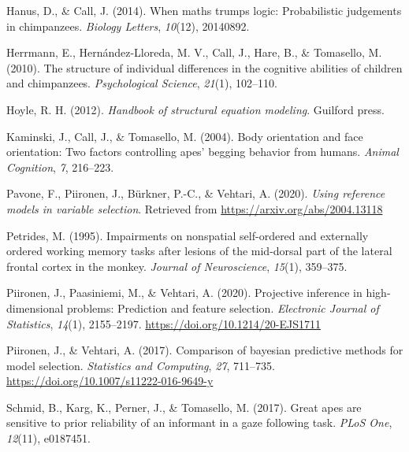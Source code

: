 \documentclass[
  man,floatsintext]{apa6}
\newlength{\cslhangindent}
\newlength{\cslentryspacingunit} %
\newenvironment{CSLReferences}[2] %
 {%
  \setlength{\parindent}{0pt}
  \ifodd #1
  \let\oldpar\par
  \def\par{\hangindent=\cslhangindent\oldpar}
  \fi
  \setlength{\parskip}{#2\cslentryspacingunit}
 }%
 {}
\begin{document}
\begin{CSLReferences}{1}{0}
\leavevmode{}%
Hanus, D., \& Call, J. (2014). When maths trumps logic: Probabilistic judgements in chimpanzees. \emph{Biology Letters}, \emph{10}(12), 20140892.

\leavevmode{}%
Herrmann, E., Hernández-Lloreda, M. V., Call, J., Hare, B., \& Tomasello, M. (2010). The structure of individual differences in the cognitive abilities of children and chimpanzees. \emph{Psychological Science}, \emph{21}(1), 102--110.

\leavevmode{}%
Hoyle, R. H. (2012). \emph{Handbook of structural equation modeling}. Guilford press.

\leavevmode{}%
Kaminski, J., Call, J., \& Tomasello, M. (2004). Body orientation and face orientation: Two factors controlling apes' begging behavior from humans. \emph{Animal Cognition}, \emph{7}, 216--223.

\leavevmode{}%
Pavone, F., Piironen, J., Bürkner, P.-C., \& Vehtari, A. (2020). \emph{Using reference models in variable selection}. Retrieved from \url{https://arxiv.org/abs/2004.13118}

\leavevmode{}%
Petrides, M. (1995). Impairments on nonspatial self-ordered and externally ordered working memory tasks after lesions of the mid-dorsal part of the lateral frontal cortex in the monkey. \emph{Journal of Neuroscience}, \emph{15}(1), 359--375.

\leavevmode{}%
Piironen, J., Paasiniemi, M., \& Vehtari, A. (2020). {Projective inference in high-dimensional problems: Prediction and feature selection}. \emph{Electronic Journal of Statistics}, \emph{14}(1), 2155--2197. \url{https://doi.org/10.1214/20-EJS1711}

\leavevmode{}%
Piironen, J., \& Vehtari, A. (2017). Comparison of bayesian predictive methods for model selection. \emph{Statistics and Computing}, \emph{27}, 711--735. \url{https://doi.org/10.1007/s11222-016-9649-y}

\leavevmode{}%
Schmid, B., Karg, K., Perner, J., \& Tomasello, M. (2017). Great apes are sensitive to prior reliability of an informant in a gaze following task. \emph{PLoS One}, \emph{12}(11), e0187451.


\end{CSLReferences}
\end{document}
